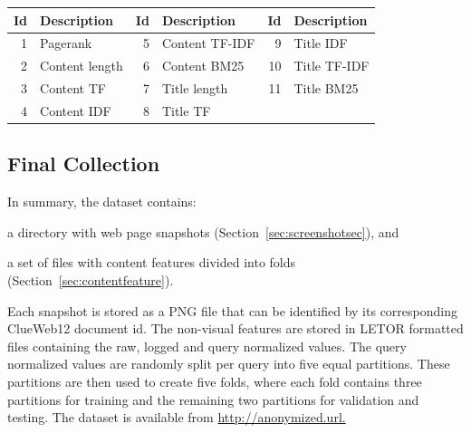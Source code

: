 \begin{table}[h]
\centering
{}  \label{tab:setdescription} 
\begin{tabular}{rlrlrl}
\toprule
Id & Description & Id & Description & Id & Description    \\ 
\midrule
1  & Pagerank  & 5  & Content TF-IDF  & 9  & Title IDF   \\
2  & Content length & 6  & Content BM25   & 10 & Title TF-IDF   \\
3  & Content TF  & 7  & Title length & 11 & Title BM25  \\
4  & Content IDF & 8  & Title TF  & & \\
\bottomrule
\end{tabular}
\end{table}

\subsection{Final Collection}\label{sec:finalcollection}
In summary, the \datasetname{} dataset contains:
\begin{inparaenum}[(i)]
\item a directory with web page snapshots (Section~\ref{sec:screenshotsec}), and
\item a set of files with content features divided into folds (Section~\ref{sec:contentfeature}).
\end{inparaenum}
Each snapshot is stored as a PNG file that can be identified by its corresponding ClueWeb12 document id. 
The non-visual features are stored in LETOR formatted files containing the raw, logged and query normalized values.
The query normalized values are randomly split per query into five equal partitions.
These partitions are then used to create five folds, where each fold contains three partitions for training and the remaining two partitions for validation and testing.
The \datasetname{} dataset is available from \url{http://anonymized.url.}


